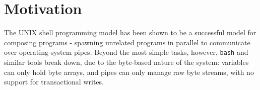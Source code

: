 \documentclass[format=sigconf, review=true, draft=true, screen=true]{acmart}
\begin{document}
\begin{abstract}
%
%
%
\end{abstract}
\maketitle

\section{Motivation}

The UNIX shell programming model has been shown to be a successful model for composing programs - spawning unrelated programs in parallel to communicate over operating-system pipes. Beyond the most simple tasks, however, \verb/bash/ and similar tools break down, due to the byte-based nature of the system: variables can only hold byte arrays, and pipes can only manage raw byte streams, with no support for transactional writes.
\end{document}
